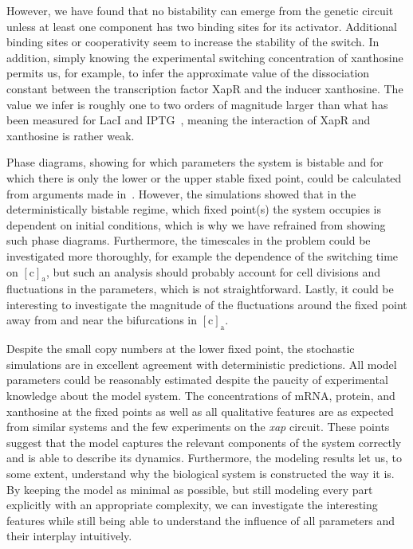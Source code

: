 \documentclass[10pt,letterpaper]{article}
\newcommand{\n}[1]{\mathrm{#1}}
\begin{document}
	However, we have found that no bistability can emerge from the genetic circuit unless
	at least one component has two binding sites for its activator. Additional
	binding sites or cooperativity seem to increase the stability of the switch.
	In addition, simply knowing the experimental switching concentration of
	xanthosine permits us, for example, to infer the approximate value of the
	dissociation constant between the transcription factor XapR and the inducer
	xanthosine. The value we infer is roughly one to two orders of magnitude
	larger than what has been measured for LacI and
	IPTG~\cite{RazoMejia2018}, meaning the interaction of XapR and
	xanthosine is rather weak.
	
	Phase diagrams, showing for which parameters the system is bistable and for
	which there is only the lower or the upper stable fixed point, could be
	calculated from arguments made in~\cite{Cherry2000}. However, the
	simulations showed that in the deterministically bistable regime, which fixed point(s) the system occupies is dependent on initial conditions, which is why we have refrained from showing such phase
	diagrams. Furthermore, the timescales in the problem could be investigated
	more thoroughly, for example the dependence of the switching time on
	$\n{[c]_a}$, but such an analysis should probably account for	cell divisions and fluctuations in the parameters, which is not straightforward. Lastly, it could be interesting to investigate the magnitude of the fluctuations around the fixed point away from and near the bifurcations in $\mathrm{[c]_a}$.
	
	Despite the small copy numbers at the lower fixed point, the stochastic simulations are in excellent agreement with deterministic predictions. All model parameters could be reasonably estimated despite the paucity of
	experimental knowledge about the model system. The concentrations of mRNA, protein, and xanthosine at the fixed points as well as all qualitative features are as expected from similar systems and the few experiments on the \emph{xap} circuit. These points suggest that the model captures the relevant components of the system correctly and is able to describe its
	dynamics. 
	Furthermore, the modeling results let us, to some extent, understand why the biological system is constructed the way it is. By keeping the model as minimal as possible, but still modeling every part explicitly with an appropriate complexity, we can investigate the interesting features while still being able to understand the influence of all parameters and their interplay intuitively.
		
\end{document}
